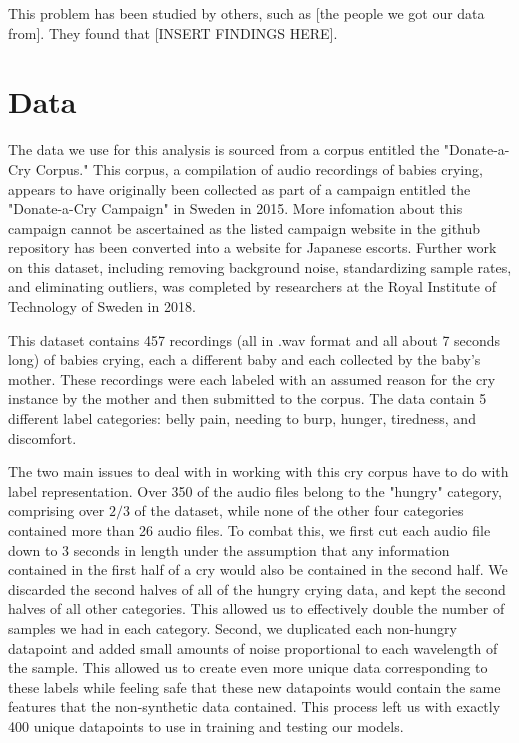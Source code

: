 \documentclass[11pt]{article}
\begin{document}
This problem has been studied by others, such as [the people we got our data from].
They found that [INSERT FINDINGS HERE].


\section{Data}
The data we use for this analysis is sourced from a corpus entitled
the "Donate-a-Cry Corpus."
This corpus, a compilation of audio recordings of babies crying, appears to have originally been collected as part of a campaign entitled the "Donate-a-Cry Campaign" in Sweden in 2015.
More infomation about this campaign cannot be ascertained as the listed campaign website in the github repository has been converted into a website for Japanese escorts.
Further work on this dataset, including removing background noise, standardizing sample rates, and eliminating outliers, was completed by researchers at the Royal Institute of Technology of Sweden in 2018.

This dataset contains 457 recordings (all in .wav format and all about 7 seconds long) of babies crying, each a different baby and each collected by the baby's mother.
These recordings were each labeled with an assumed reason for the cry instance by the mother and then submitted to the corpus.
The data contain 5 different label categories: belly pain, needing to burp, hunger, tiredness, and discomfort.

The two main issues to deal with in working with this cry corpus have to do with label representation.
Over 350 of the audio files belong to the "hungry" category, comprising over $2/3$ of the dataset, while none of the other four categories contained more than 26 audio files.
To combat this, we first cut each audio file down to 3 seconds in length under the assumption that any information contained in the first half of a cry would also be contained in the second half.
We discarded the second halves of all of the hungry crying data, and kept the second halves of all other categories.
This allowed us to effectively double the number of samples we had in each category.
Second, we duplicated each non-hungry datapoint and added small amounts of noise proportional to each wavelength of the sample.
This allowed us to create even more unique data corresponding to these labels while feeling safe that these new datapoints would contain the same features that the non-synthetic data contained.
This process left us with exactly 400 unique datapoints to use in training and testing our models.
\end{document}
